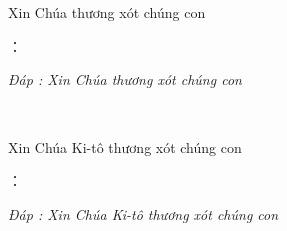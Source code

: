 \documentclass[12pt]{article}
\begin{document}
\setlength{\columnsep}{4em}
\setlength{\columnseprule}{0.4pt}

\begin{center}
\Huge{\ \ }\\[2cm]
\end{center}

\begin{paracol}{2}

\begin{leftcolumn*}
\Large{\ \ \ \ \ }\\
\end{leftcolumn*}

\begin{rightcolumn}
Xin Chúa thương xót chúng con\\
\end{rightcolumn}

\begin{leftcolumn*}
\Large{：\ \ \ \ \ \ }\\
\end{leftcolumn*}

\begin{rightcolumn}
\textit{Đáp : Xin Chúa thương xót chúng con}\\
\end{rightcolumn}

\begin{leftcolumn*}
\Large{\ \ \ \  \ \ \ }\\
\end{leftcolumn*}

\begin{rightcolumn}
Xin Chúa Ki-tô thương xót chúng con\\
\end{rightcolumn}

\begin{leftcolumn*}
\Large{：\ \ \ \ \ \ \ \ }\\
\end{leftcolumn*}

\begin{rightcolumn}
\textit{Đáp : Xin Chúa Ki-tô thương xót chúng con}\\
\end{rightcolumn}



\end{paracol}
\end{document}
